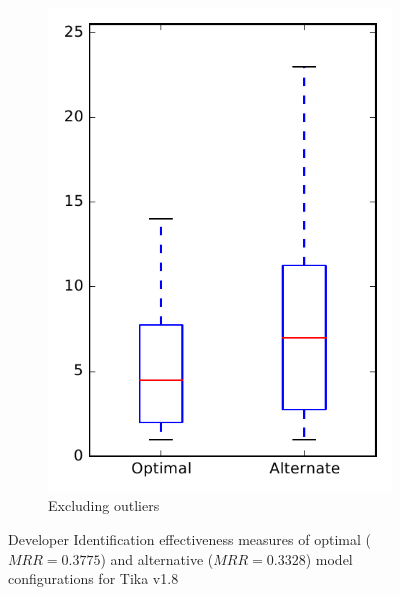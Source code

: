 \begin{figure}
\begin{subfigure}{.4\textwidth}
        \includegraphics[height=0.4\textheight]{figures/combo/dit_rq1_tika_no_outlier}
        \caption{Excluding outliers}\label{fig:combo:dit:rq1:tika_no_outlier}
    \end{subfigure}
\caption{Developer Identification effectiveness measures of optimal ($MRR=0.3775$) and alternative ($MRR=0.3328$) model configurations for Tika v1.8}
\label{fig:combo:dit:rq1:tika}
\end{figure}
